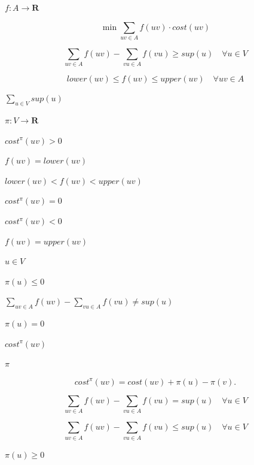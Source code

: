 \documentclass{article}
\begin{document}
$f: A\rightarrow\mathbf{R}$
\pagebreak

\[ \min\sum_{uv\in A} f(uv) \cdot cost(uv) \]
\pagebreak

\[ \sum_{uv\in A} f(uv) - \sum_{vu\in A} f(vu) \geq sup(u) \quad \forall u\in V \]
\pagebreak

\[ lower(uv) \leq f(uv) \leq upper(uv) \quad \forall uv\in A \]
\pagebreak

$\sum_{u\in V} sup(u)$
\pagebreak

$\pi: V\rightarrow\mathbf{R}$
\pagebreak

$cost^\pi(uv)>0$
\pagebreak

$f(uv)=lower(uv)$
\pagebreak

$lower(uv)<f(uv)<upper(uv)$
\pagebreak

$cost^\pi(uv)=0$
\pagebreak

$cost^\pi(uv)<0$
\pagebreak

$f(uv)=upper(uv)$
\pagebreak

$u\in V$
\pagebreak

$\pi(u)\leq 0$
\pagebreak

$\sum_{uv\in A} f(uv) - \sum_{vu\in A} f(vu) \neq sup(u)$
\pagebreak

$\pi(u)=0$
\pagebreak

$cost^\pi(uv)$
\pagebreak

$\pi$
\pagebreak

\[ cost^\pi(uv) = cost(uv) + \pi(u) - \pi(v).\]
\pagebreak

\[ \sum_{uv\in A} f(uv) - \sum_{vu\in A} f(vu) = sup(u) \quad \forall u\in V \]
\pagebreak

\[ \sum_{uv\in A} f(uv) - \sum_{vu\in A} f(vu) \leq sup(u) \quad \forall u\in V \]
\pagebreak

$\pi(u)\geq 0$
\pagebreak
\end{document}
